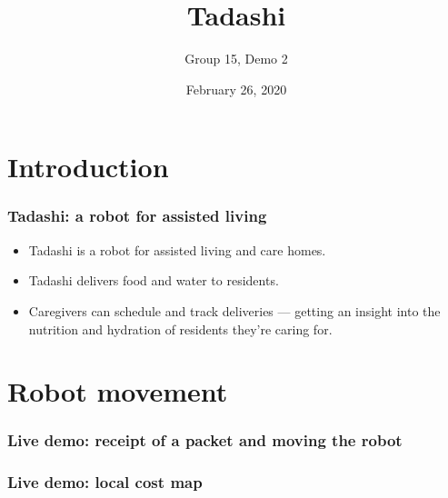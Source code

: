 \documentclass{beamer}
\title{Tadashi}
\subtitle{Group 15, Demo 2}
\institute{\vspace{2em}\texttt{[image: figs/logo.png]}}
\date{February 26, 2020}
\begin{document}
\maketitle
\section{Introduction}
\begin{frame}
  \frametitle{Tadashi: a robot for assisted living}
  \begin{itemize}
    \item Tadashi is a robot for assisted living and care homes.
    \item Tadashi delivers food and water to residents.
    \item Caregivers can schedule and track deliveries --- getting an insight into the nutrition and hydration of residents they're caring for.
  \end{itemize}
\end{frame}

\section{Robot movement}
\begin{frame}
  \frametitle{Live demo: receipt of a packet and moving the robot}
\end{frame}
\begin{frame}
  \frametitle{Live demo: local cost map}
\end{frame}
\end{document}
